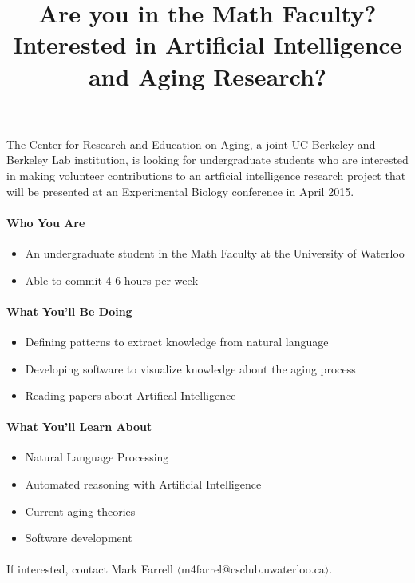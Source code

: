 \documentclass[10pt, a4paper, notitlepage]{article}
\begin{document}
\title{Are you in the Math Faculty?
\\ Interested in Artificial Intelligence and Aging Research?}
\date{}

\maketitle

\paragraph{} %

The Center for Research and Education on Aging, a joint UC Berkeley and Berkeley Lab institution, is looking for undergraduate students who are interested in making volunteer contributions to an artficial intelligence research project that will be presented at an Experimental Biology conference in April 2015.

\paragraph{Who You Are}

\begin{itemize}
\item An undergraduate student in the Math Faculty at the University of Waterloo
\item Able to commit 4-6 hours per week
\end{itemize}

\paragraph{What You'll Be Doing}

\begin{itemize}
\item Defining patterns to extract knowledge from natural language
\item Developing software to visualize knowledge about the aging process
\item Reading papers about Artifical Intelligence
\end{itemize}

\paragraph{What You'll Learn About}

\begin{itemize}
\item Natural Language Processing
\item Automated reasoning with Artificial Intelligence
\item Current aging theories
\item Software development
\end{itemize}

\paragraph{}

If interested, contact Mark Farrell $\langle$m4farrel@csclub.uwaterloo.ca$\rangle$.
\end{document}
